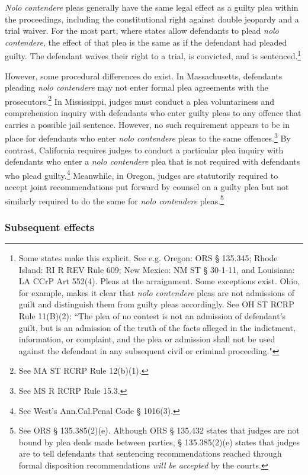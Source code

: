 \textit{Nolo contendere} pleas generally have the same legal effect as a guilty plea within the proceedings, including the constitutional right against double jeopardy and a trial waiver. For the most part, where states allow defendants to plead \textit{nolo contendere}, the effect of that plea is the same as if the defendant had pleaded guilty. The defendant waives their right to a trial, is convicted, and is sentenced.\footnote{Some states make this explicit. See e.g. Oregon: ORS § 135.345; Rhode Island: RI R REV Rule 609; New Mexico: NM ST § 30-1-11, and Louisiana: LA CCrP Art 552(4). Pleas at the arraignment. Some exceptions exist. Ohio, for example, makes it clear that \textit{nolo contendere} pleas are not admissions of guilt and distinguish them from guilty pleas accordingly. See OH ST RCRP Rule 11(B)(2): ``The plea of no contest is not an admission of defendant's guilt, but is an admission of the truth of the facts alleged in the indictment, information, or complaint, and the plea or admission shall not be used against the defendant in any subsequent civil or criminal proceeding."}

However, some procedural differences do exist. In Massachusetts, defendants pleading \textit{nolo contendere} may not enter formal plea agreements with the prosecutors.\footnote{See MA ST RCRP Rule 12(b)(1).} In Mississippi, judges must conduct a plea voluntariness and comprehension inquiry with defendants who enter guilty pleas to any offence that carries a possible jail sentence. However, no such requirement appears to be in place for defendants who enter \textit{nolo contendere} pleas to the same offences.\footnote{See MS R RCRP Rule 15.3.} By contrast, California requires judges to conduct a particular plea inquiry with defendants who enter a \textit{nolo contendere} plea that is not required with defendants who plead guilty.\footnote{See West's Ann.Cal.Penal Code § 1016(3).} Meanwhile, in Oregon, judges are statutorily required to accept joint recommendations put forward by counsel on a guilty plea but not similarly required to do the same for \textit{nolo contendere} pleas.\footnote{See ORS § 135.385(2)(e). Although ORS § 135.432 states that judges are not bound by plea deals made between parties, § 135.385(2)(e) states that judges are to tell defendants that sentencing recommendations reached through formal disposition recommendations \textit{will be accepted} by the courts.} 

\subsubsection{Subsequent effects}

